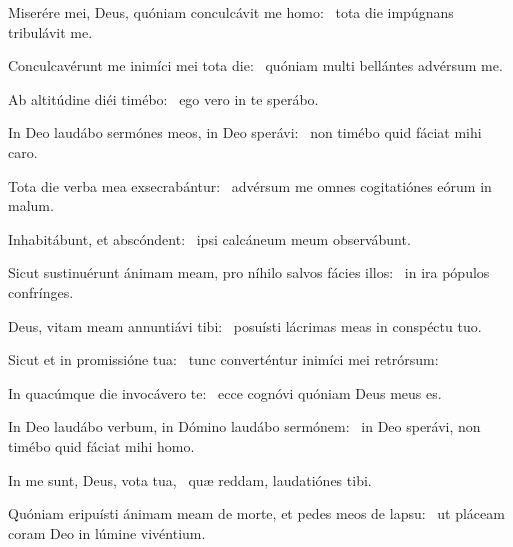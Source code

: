 \item Miserére mei, Deus, quóniam conculcávit me homo:~\psstar{} tota die impúgnans tribulávit me.

\item Conculcavérunt me inimíci mei tota die:~\psstar{} quóniam multi bellántes advérsum me.

\item Ab altitúdine diéi timébo:~\psstar{} ego vero in te sperábo.

\item In Deo laudábo sermónes meos, in Deo sperávi:~\psstar{} non timébo quid fáciat mihi caro.

\item Tota die verba mea exsecrabántur:~\psstar{} advérsum me omnes cogitatiónes eórum in malum.

\item Inhabitábunt, et abscón\-dent:~\psstar{} ipsi calcáneum meum observábunt.

\item Sicut sustinuérunt ánimam meam, pro níhilo salvos fácies illos:~\psstar{} in ira pópulos confrínges.

\item Deus, vitam meam annuntiávi tibi:~\psstar{} posuísti lácrimas meas in conspéctu tuo.

\item Sicut et in promissióne tua:~\psstar{} tunc converténtur inimíci mei retrórsum:

\item In quacúmque die invocávero te:~\psstar{} ecce cognóvi quóniam Deus meus es.

\item In Deo laudábo verbum, in Dómino laudábo sermónem:~\psstar{} in Deo sperávi, non timébo quid fáciat mihi homo.

\item In me sunt, Deus, vota tua,~\psstar{} quæ reddam, laudatiónes tibi.

\item Quóniam eripuísti ánimam meam de morte, et pedes meos de lapsu:~\psstar{} ut pláceam coram Deo in lúmine vivéntium.
